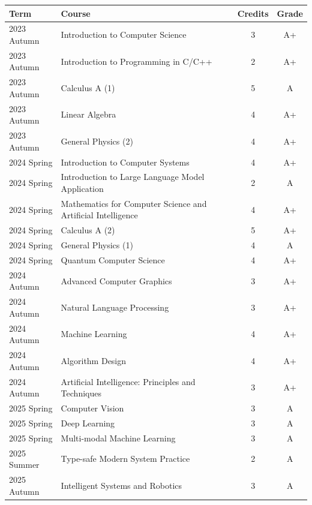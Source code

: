 \documentclass[a4paper,10pt]{article}
\begin{document}
{\small\centering
\setlength{\tabcolsep}{5pt}
\renewcommand{\arraystretch}{1.0}
\begin{tabularx}{0.85\textwidth}{@{}l>{\raggedright\arraybackslash}Xcc@{}}
\textbf{Term} & \textbf{Course} & \textbf{Credits} & \textbf{Grade} \\
\hline
2023 Autumn & Introduction to Computer Science & 3 & A+ \\
2023 Autumn & Introduction to Programming in C/C++ & 2 & A+ \\
2023 Autumn & Calculus A (1) & 5 & A \\
2023 Autumn & Linear Algebra & 4 & A+ \\
2023 Autumn & General Physics (2) & 4 & A+ \\
2024 Spring & Introduction to Computer Systems & 4 & A+ \\
2024 Spring & Introduction to Large Language Model Application & 2 & A \\
2024 Spring & Mathematics for Computer Science and Artificial Intelligence & 4 & A+ \\
2024 Spring & Calculus A (2) & 5 & A+ \\
2024 Spring & General Physics (1) & 4 & A \\
2024 Spring & Quantum Computer Science & 4 & A+ \\
2024 Autumn & Advanced Computer Graphics & 3 & A+ \\
2024 Autumn & Natural Language Processing & 3 & A+ \\
2024 Autumn & Machine Learning & 4 & A+ \\
2024 Autumn & Algorithm Design & 4 & A+ \\
2024 Autumn & Artificial Intelligence: Principles and Techniques & 3 & A+ \\
2025 Spring & Computer Vision & 3 & A \\
2025 Spring & Deep Learning & 3 & A \\
2025 Spring & Multi-modal Machine Learning & 3 & A \\
2025 Summer & Type-safe Modern System Practice & 2 & A \\
2025 Autumn & Intelligent Systems and Robotics & 3 & A \\
\end{tabularx}
\par
}
\end{document}
